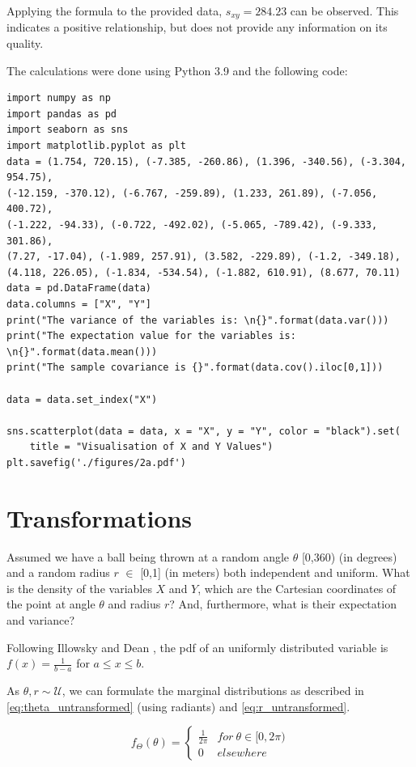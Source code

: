 Applying the formula to the provided data, $s_{xy} = 284.23$ can be observed. This indicates a positive relationship, but does not provide any information on its quality. 

The calculations were done using Python 3.9 and the following code:

\begin{verbatim}
import numpy as np
import pandas as pd
import seaborn as sns
import matplotlib.pyplot as plt
data = (1.754, 720.15), (-7.385, -260.86), (1.396, -340.56), (-3.304, 954.75),
(-12.159, -370.12), (-6.767, -259.89), (1.233, 261.89), (-7.056, 400.72), 
(-1.222, -94.33), (-0.722, -492.02), (-5.065, -789.42), (-9.333, 301.86),
(7.27, -17.04), (-1.989, 257.91), (3.582, -229.89), (-1.2, -349.18), 
(4.118, 226.05), (-1.834, -534.54), (-1.882, 610.91), (8.677, 70.11)
data = pd.DataFrame(data)
data.columns = ["X", "Y"]
print("The variance of the variables is: \n{}".format(data.var()))
print("The expectation value for the variables is: \n{}".format(data.mean()))
print("The sample covariance is {}".format(data.cov().iloc[0,1]))

data = data.set_index("X")

sns.scatterplot(data = data, x = "X", y = "Y", color = "black").set(
    title = "Visualisation of X and Y Values")
plt.savefig('./figures/2a.pdf')
\end{verbatim}


\section{Transformations}
Assumed we have a ball being thrown at a random angle $\theta$ [0,360) (in degrees) and a random radius $r$ $\in$ [0,1] (in meters) both independent and uniform. What is the density of the variables $X$ and $Y$, which are the Cartesian coordinates of the point at angle $\theta$ and radius $r$? And, furthermore, what is their expectation and variance?

Following Illowsky and Dean \cite[Chapter~5.2]{illowsky2018introductory}, the pdf of an uniformly distributed variable is $f(x) = \frac{1}{b-a}$ for $a \leq x \leq b$. 

As $\theta,r \sim \mathcal{U}$, we can formulate the marginal distributions as described in \eqref{eq:theta_untransformed} (using radiants) and \eqref{eq:r_untransformed}.

\begin{equation}
f_\Theta(\theta) = 
\begin{cases} 
      \frac{1}{2\pi} & for~\theta \in [0,2\pi)\\
      0&elsewhere
   \end{cases}
\label{eq:theta_untransformed}
\end{equation}

